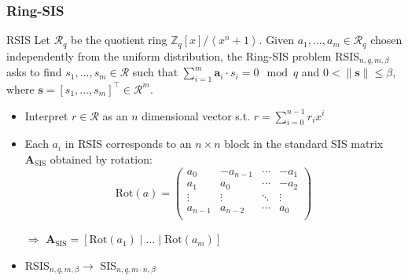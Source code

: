 \documentclass[t, aspectratio=169]{beamer}
\begin{document}
\begin{frame}
    \frametitle{Ring-SIS}
    \begin{block}{RSIS}
        Let $\mathcal{R}_q$ be the quotient ring $\mathbb{Z}_q\left[x\right] / \left\langle x^n + 1 \right\rangle$. Given $a_1, \ldots, a_m \in \mathcal{R}_q$ chosen independently from the uniform distribution, the Ring-SIS problem RSIS$_{n, q, m, \beta}$ asks to find $s_1, \ldots, s_m \in \mathcal{R}$ such that $\sum_{i=1}^m \mathbf{a}_i \cdot s_i = 0 \mod q$ and $0 < \| \mathbf{s}\| \leq \beta$, where $\mathbf{s} = \left[s_1, \ldots, s_m\right]^\intercal \in \mathcal{R}^m$.
    \end{block}
    \pause
    \begin{itemize}[<+->]
        \item Interpret $r \in \mathcal{R}$ as an $n$ dimensional vector s.t. $r = \sum_{i=0}^{n-1} r_i x^i$
        \item Each $a_i$ in RSIS corresponds to an $n\times n$ block in the standard SIS matrix $\mathbf{A}_\text{SIS}$ obtained by rotation:
              \begin{equation*}
                  \text{Rot}(a) = \begin{pmatrix}
                      a_0     & -a_{n-1} & \cdots & -a_{1} \\
                      a_1     & a_{0}    & \cdots & -a_{2} \\
                      \vdots  & \vdots   & \ddots & \vdots \\
                      a_{n-1} & a_{n-2}  & \cdots & a_{0}  \\
                  \end{pmatrix}
              \end{equation*}
        \item[$\Rightarrow$] $\mathbf{A}_\text{SIS} = [\text{Rot}(a_1)\mid \dots \mid \text{Rot}(a_m)]$
        \item RSIS$_{n, q, m, \beta} \longrightarrow$ SIS$_{n, q, m \cdot n, \beta}$
    \end{itemize}
\end{frame}
\end{document}
